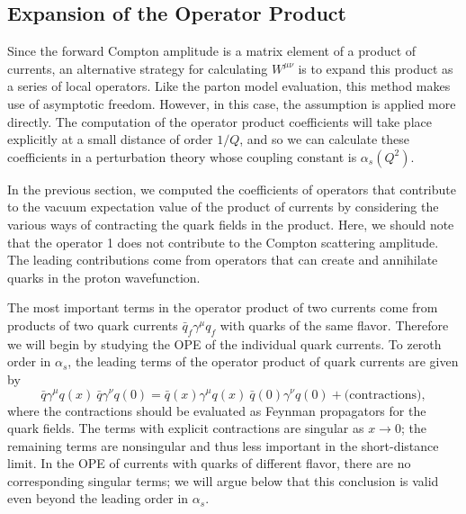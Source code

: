 \subsection{Expansion of the Operator Product}

Since the forward Compton amplitude is a matrix element of a product of
currents, an alternative strategy for calculating $W^{\mu\nu}$ is to expand
this product as a series of local operators.  Like the parton model
evaluation, this method makes use of asymptotic freedom.  However, in this
case, the assumption is applied more directly.  The computation of the
operator product coefficients will take place explicitly at a small distance
of order $1/Q$, and so we can calculate these coefficients in a perturbation
theory whose coupling constant is $\alpha_s(Q^2)$.

In the previous section, we computed the coefficients of operators that
contribute to the vacuum expectation value of the product of currents by
considering the various ways of contracting the quark fields in the product.
Here, we should note that the operator 1 does not contribute to the Compton
scattering amplitude.  The leading contributions come from operators that can
create and annihilate quarks in the proton wavefunction.

The most important terms in the operator product of two currents come from
products of two quark currents $\bar{q}_f\gamma^\mu q_f$ with quarks of the
same flavor.  Therefore we will begin by studying the OPE of the individual
quark currents.  To zeroth order in $\alpha_s$, the leading terms of the
operator product of quark currents are given by
\begin{equation}
  \bar{q}\gamma^\mu q(x)\ \bar{q}\gamma^\nu q(0)
  = \bar{q}(x)\gamma^\mu q(x)\ \bar{q}(0)\gamma^\nu q(0)
    + \text{(contractions)} ,
  \label{eq:18.124}
\end{equation}
where the contractions should be evaluated as Feynman propagators for the
quark fields.  The terms with explicit contractions are singular as
$x\to 0$; the remaining terms are nonsingular and thus less important in the
short-distance limit.  In the OPE of currents with quarks of different
flavor, there are no corresponding singular terms; we will argue below that
this conclusion is valid even beyond the leading order in $\alpha_s$.

